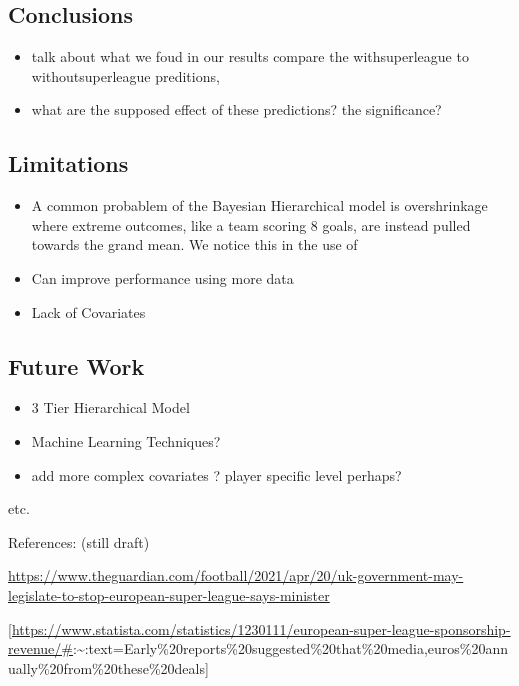 \documentclass[
]{article}
\providecommand{\tightlist}{%
  \setlength{\itemsep}{0pt}\setlength{\parskip}{0pt}}
\begin{document}
\hypertarget{conclusions}{%
\subsection{Conclusions}\label{conclusions}}

\begin{itemize}
\tightlist
\item
  talk about what we foud in our results compare the withsuperleague to
  withoutsuperleague preditions,
\item
  what are the supposed effect of these predictions? the significance?
\end{itemize}

\hypertarget{limitations}{%
\subsection{Limitations}\label{limitations}}

\begin{itemize}
\item
  A common probablem of the Bayesian Hierarchical model is overshrinkage
  where extreme outcomes, like a team scoring 8 goals, are instead
  pulled towards the grand mean. We notice this in the use of
\item
  Can improve performance using more data
\item
  Lack of Covariates
\end{itemize}

\hypertarget{future-work}{%
\subsection{Future Work}\label{future-work}}

\begin{itemize}
\item
  3 Tier Hierarchical Model
\item
  Machine Learning Techniques?
\item
  add more complex covariates ? player specific level perhaps?
\end{itemize}

etc.

References: (still draft)

\url{https://www.theguardian.com/football/2021/apr/20/uk-government-may-legislate-to-stop-european-super-league-says-minister}

{[}\url{https://www.statista.com/statistics/1230111/european-super-league-sponsorship-revenue/\#}:\textasciitilde:text=Early\%20reports\%20suggested\%20that\%20media,euros\%20annually\%20from\%20these\%20deals{]}
\end{document}
